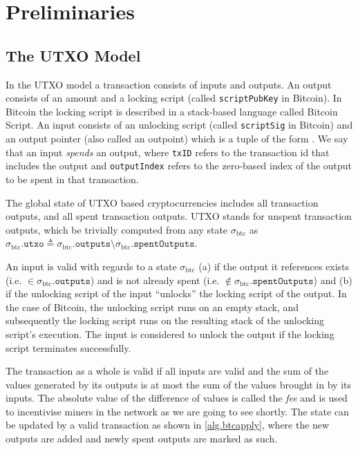 \section{Preliminaries}
\subsection{The UTXO Model}
In the UTXO model a transaction consists of inputs and outputs. An output consists of an amount and a locking script (called \texttt{scriptPubKey} in Bitcoin). In Bitcoin the locking script is described in a stack-based language called Bitcoin Script. An input consists of an unlocking script (called \texttt{scriptSig} in Bitcoin) and an output pointer (also called an outpoint) which is a tuple of the form . We say that an input \emph{spends} an output, where \texttt{txID} refers to the transaction id that includes the output and \texttt{outputIndex} refers to the zero-based index of the output to be spent in that transaction.

\def\btcstate{\ensuremath{\sigma_\text{btc}}}
\def\btcapply{\text{apply}\textsubscript{btc}}
\def\outputs{\texttt{outputs}}
\def\inputs{\texttt{inputs}}
\def\spentOutputs{\texttt{spentOutputs}}
\def\utxo{\texttt{utxo}}
The global state of UTXO based cryptocurrencies includes all transaction outputs, and all spent transaction outputs. UTXO stands for unspent transaction outputs, which be trivially computed from any state $\btcstate$ as $\btcstate.\utxo \triangleq \btcstate.\outputs \setminus \btcstate.\spentOutputs$.

An input is valid with regards to a state $\btcstate$ (a) if the output it references exists (i.e. $\in \btcstate.\outputs$) and is not already spent (i.e. $\notin \btcstate.\spentOutputs$) and (b) if the unlocking script of the input ``unlocks'' the locking script of the output. In the case of Bitcoin, the unlocking script runs on an empty stack, and subsequently the locking script runs on the resulting stack of the unlocking script's execution. The input is considered to unlock the output if the locking script terminates successfully.

The transaction as a whole is valid if all inputs are valid and the sum of the values generated by its outputs is at most the sum of the values brought in by its inputs. The absolute value of the difference of values is called the \emph{fee} and is used to incentivise miners in the network as we are going to see shortly. The state can be updated by a valid transaction as shown in \cref{alg.btcapply}, where the new outputs are added and newly spent outputs are marked as such.

